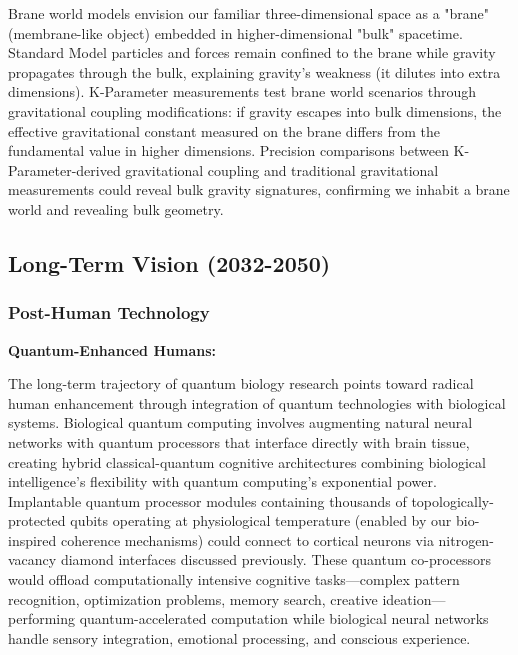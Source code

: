 \documentclass[11pt,a4paper,twoside]{article}
\begin{document}
Brane world models envision our familiar three-dimensional space as a "brane" (membrane-like object) embedded in higher-dimensional "bulk" spacetime. Standard Model particles and forces remain confined to the brane while gravity propagates through the bulk, explaining gravity's weakness (it dilutes into extra dimensions). K-Parameter measurements test brane world scenarios through gravitational coupling modifications: if gravity escapes into bulk dimensions, the effective gravitational constant measured on the brane differs from the fundamental value in higher dimensions. Precision comparisons between K-Parameter-derived gravitational coupling and traditional gravitational measurements could reveal bulk gravity signatures, confirming we inhabit a brane world and revealing bulk geometry.

\subsection{Long-Term Vision (2032-2050)}

\subsubsection{Post-Human Technology}

\textbf{Quantum-Enhanced Humans:}

The long-term trajectory of quantum biology research points toward radical human enhancement through integration of quantum technologies with biological systems. Biological quantum computing involves augmenting natural neural networks with quantum processors that interface directly with brain tissue, creating hybrid classical-quantum cognitive architectures combining biological intelligence's flexibility with quantum computing's exponential power. Implantable quantum processor modules containing thousands of topologically-protected qubits operating at physiological temperature (enabled by our bio-inspired coherence mechanisms) could connect to cortical neurons via nitrogen-vacancy diamond interfaces discussed previously. These quantum co-processors would offload computationally intensive cognitive tasks---complex pattern recognition, optimization problems, memory search, creative ideation---performing quantum-accelerated computation while biological neural networks handle sensory integration, emotional processing, and conscious experience.
\end{document}
